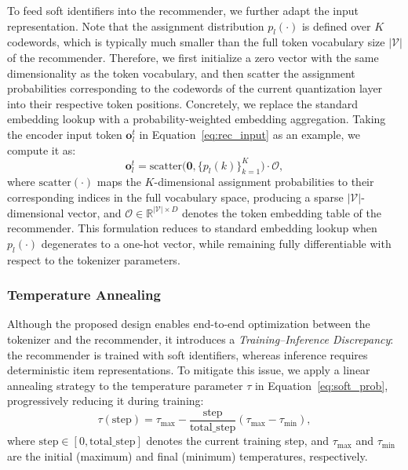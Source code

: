 To feed soft identifiers into the recommender, we further adapt the input representation. Note that the assignment distribution $p_l(\cdot)$ is defined over $K$ codewords, which is typically much smaller than the full token vocabulary size $|\mathcal{V}|$ of the recommender. Therefore, we first initialize a zero vector with the same dimensionality as the token vocabulary, and then scatter the assignment probabilities corresponding to the codewords of the current quantization layer into their respective token positions. Concretely, we replace the standard embedding lookup with a probability-weighted embedding aggregation. 
Taking the encoder input token $\bm{o}_l^t$ in Equation~\eqref{eq:rec_input} as an example, we compute it as:
\begin{equation}\label{eq:new_rec_input}
\bm{o}_l^t = \text{scatter}\big(\bm{0}, \{p_l(k)\}_{k=1}^{K}\big)\cdot \bm{\mathcal{O}},
\end{equation}
where $\text{scatter}(\cdot)$ maps the $K$-dimensional assignment probabilities to their corresponding indices in the full vocabulary space, producing a sparse $|\mathcal{V}|$-dimensional vector, and $\bm{\mathcal{O}} \in \mathbb{R}^{|\mathcal{V}| \times D}$ denotes the token embedding table of the recommender. This formulation reduces to standard embedding lookup when $p_l(\cdot)$ degenerates to a one-hot vector, while remaining fully differentiable with respect to the tokenizer parameters.


\subsubsection{Temperature Annealing}
Although the proposed design enables end-to-end optimization between the tokenizer and the recommender, it introduces a \textit{Training–Inference Discrepancy}: the recommender is trained with soft identifiers, whereas inference requires deterministic item representations. To mitigate this issue, we apply a linear annealing strategy to the temperature parameter $\tau$ in Equation~\eqref{eq:soft_prob}, progressively reducing it during training:
\begin{equation}\label{eq:tau_sche}
    \tau(\text{step}) = \tau_{\max} - \frac{\text{step}}{\text{total\_step}} \left(\tau_{\max} - \tau_{\min}\right),
\end{equation}
where $\text{step} \in [0, \text{total\_step}]$ denotes the current training step, and $\tau_{\max}$ and $\tau_{\min}$ are the initial (maximum) and final (minimum) temperatures, respectively.

